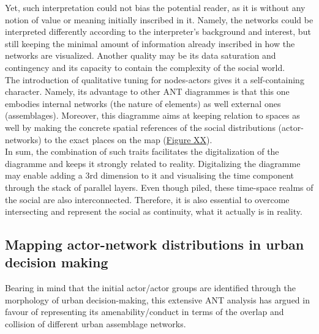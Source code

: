\documentclass[11pt]{report}
\begin{document}
Yet, such interpretation could not bias the potential reader, as it is without any notion of value or meaning initially inscribed in it.
Namely, the networks could be interpreted differently according to the interpreter's background and interest, but still keeping the minimal amount of information already inscribed in how the networks are visualized.
Another quality may be its data saturation and contingency and its capacity to contain the complexity of the social world.
\\

The introduction of qualitative tuning for nodes-actors gives it a self-containing character.
Namely, its advantage to other ANT diagrammes is that this one embodies internal  networks (the nature of elements) as well external ones (assemblages).
Moreover, this diagramme aims at keeping relation to spaces as well by making the concrete spatial references of the social distributions (actor-networks) to the exact places on the map (\href{}{Figure XX}).
\\

In sum, the combination of such traits facilitates the digitalization of the diagramme and keeps it strongly related to reality.
Digitalizing the diagramme  may enable adding a 3rd dimension to it and visualising the time component through the stack of parallel layers. Even though piled, these time-space realms of the social are also interconnected.
Therefore, it is also essential to overcome intersecting and represent the social as continuity, what it actually is in reality. 
  
\subsection{Mapping actor-network distributions in urban decision making}

Bearing in mind that the initial actor/actor groups are identified through the morphology of urban decision-making, this extensive ANT analysis has argued in favour of representing its amenability/conduct in terms of the overlap and collision of different urban assemblage networks.
\\
\end{document}
